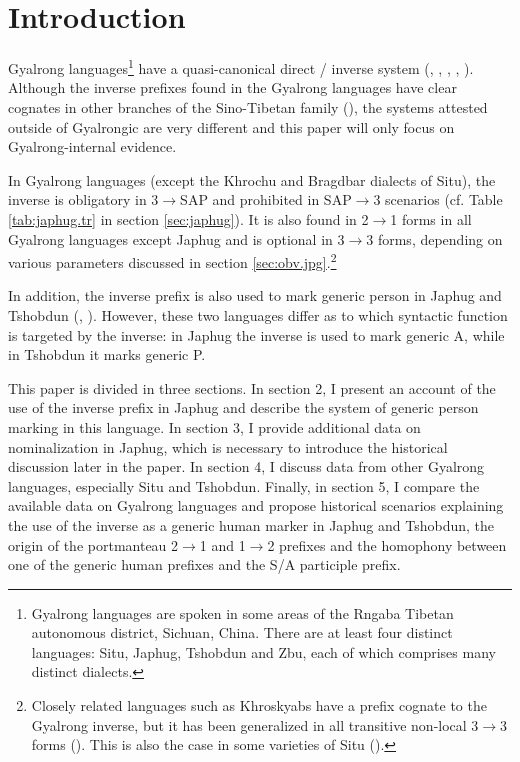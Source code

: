 \documentclass[oneside,a4paper,11pt]{article}
\begin{document}
\section{Introduction}
Gyalrong languages\footnote{Gyalrong languages are spoken in some areas of the Rngaba Tibetan autonomous district, Sichuan, China. There are at least four distinct languages: Situ, Japhug, Tshobdun and Zbu, each of which comprises many distinct dialects.} have a quasi-canonical direct / inverse system (\citealt{delancey81direction}, \citealt{jackson02rentongdengdi}, \citealt{jacques10inverse}, \citealt{gongxun14agreement}, \citealt{jacques14inverse}). Although the inverse prefixes found in the Gyalrong languages have  clear cognates  in other branches of the Sino-Tibetan family (\citealt{delancey10agreement}), the systems attested outside of Gyalrongic are very different and this paper will only focus on Gyalrong-internal evidence.

In Gyalrong languages (except the Khrochu and Bragdbar dialects of Situ), the inverse is obligatory in 3$\rightarrow$SAP and prohibited in SAP$\rightarrow$3 scenarios (cf. Table \ref{tab:japhug.tr} in section \ref{sec:japhug}). It is also found in  2$\rightarrow$1 forms in all Gyalrong languages except Japhug and is optional in 3$\rightarrow$3 forms, depending on various parameters discussed  in section \ref{sec:obv.jpg}.\footnote{Closely related languages such as Khroskyabs have a prefix cognate to the Gyalrong inverse, but it has been generalized in all transitive non-local 3$\rightarrow$3 forms (\citealt{lai15person}). This is also the case in some varieties of Situ (\citealt{jackson15sastod, zhangshuya16proximate}).}

In addition, the inverse prefix is also used to mark generic person in Japhug and Tshobdun  (\citealt{jacques12demotion}, \citealt{sun14generic}). However, these two languages differ as to which syntactic function is targeted by the inverse: in Japhug the inverse is used to mark generic A, while in Tshobdun it marks generic P. 

  This paper is divided in three sections. In section 2, I present an account of the use of the inverse prefix in Japhug and describe the system of generic person marking in this language. In section 3, I provide additional data on nominalization in Japhug, which is necessary to introduce the historical discussion later in the paper. In section 4, I discuss data from other Gyalrong languages, especially Situ and Tshobdun. Finally, in section 5, I compare the available data on Gyalrong languages and propose historical scenarios explaining the use of the inverse as a generic human marker in Japhug and Tshobdun, the origin of the portmanteau 2$\rightarrow$1 and 1$\rightarrow$2 prefixes and the homophony between one of the generic human prefixes and the S/A participle prefix.
  
\end{document}
